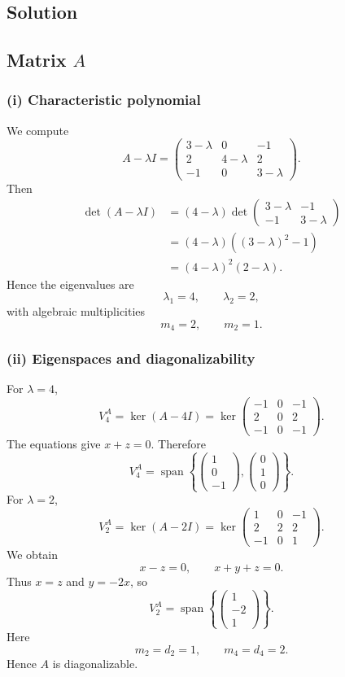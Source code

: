 \documentclass[11pt,a4paper]{article}
\newcommand{\Span}{\operatorname{span}}
\begin{document}
\subsection*{Solution}
\subsection*{Matrix $A$}

\subsubsection*{(i) Characteristic polynomial}
We compute
\[
A-\lambda I=\begin{pmatrix}
3-\lambda&0&-1\\
2&4-\lambda&2\\
-1&0&3-\lambda
\end{pmatrix}.
\]
Then
\begin{align*}
\det(A-\lambda I)
&=(4-\lambda)\det\begin{pmatrix}3-\lambda&-1\\-1&3-\lambda\end{pmatrix}\\
&=(4-\lambda)((3-\lambda)^2-1)\\
&=(4-\lambda)^2(2-\lambda).
\end{align*}
Hence the eigenvalues are
\[
\lambda_1=4,\qquad \lambda_2=2,
\]
with algebraic multiplicities
\[
m_4=2,\qquad m_2=1.
\]

\subsubsection*{(ii) Eigenspaces and diagonalizability}
For $\lambda=4$,
\[
V_4^A=\ker(A-4I)=\ker\begin{pmatrix}
-1&0&-1\\
2&0&2\\
-1&0&-1
\end{pmatrix}.
\]
The equations give $x+z=0$. Therefore
\[
V_4^A=\Span\left\{\begin{pmatrix}1\\0\\-1\end{pmatrix},
\begin{pmatrix}0\\1\\0\end{pmatrix}\right\}.
\]
For $\lambda=2$,
\[
V_2^A=\ker(A-2I)=\ker\begin{pmatrix}
1&0&-1\\
2&2&2\\
-1&0&1
\end{pmatrix}.
\]
We obtain
\[
x-z=0,\qquad x+y+z=0.
\]
Thus $x=z$ and $y=-2x$, so
\[
V_2^A=\Span\left\{\begin{pmatrix}1\\-2\\1\end{pmatrix}\right\}.
\]
Here
\[
m_2=d_2=1,
\qquad
m_4=d_4=2.
\]
Hence $A$ is diagonalizable.
\end{document}
